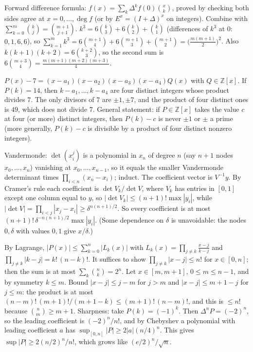 \documentclass[11pt,a4paper]{article}
\begin{document}
 Forward difference formula: $f(x)=\sum_k\Delta^kf(0)\binom xk$, proved by checking both sides agree at $x=0,\dots,\deg f$ (or by $E^x=(I+\Delta)^x$ on integers). Combine with $\sum_{k=0}^{m}\binom kj=\binom{m+1}{j+1}$.
 $k^3=6\binom k3+6\binom k2+\binom k1$ (differences of $k^3$ at $0$: $0,1,6,6$), so $\sum_{k=1}^mk^3=6\binom{m+1}4+6\binom{m+1}3+\binom{m+1}2=\bigl(\frac{m(m+1)}2\bigr)^2$. Also $k(k+1)(k+2)=6\binom{k+2}3$, so the second sum is $6\binom{m+3}4=\frac{m(m+1)(m+2)(m+3)}4$.

 $P(x)-7=(x-a_1)(x-a_2)(x-a_3)(x-a_4)Q(x)$ with $Q\in\mathbb{Z}[x]$.
 If $P(k)=14$, then $k-a_1,\dots,k-a_4$ are four distinct integers whose product divides $7$. The only divisors of $7$ are $\pm1,\pm7$, and the product of four distinct ones is $49$, which does not divide $7$.
 General statement: if $P\in\mathbb{Z}[x]$ takes the value $c$ at four (or more) distinct integers, then $P(k)-c$ is never $\pm1$ or $\pm$ a prime (more generally, $P(k)-c$ is divisible by a product of four distinct nonzero integers).

 Vandermonde: $\det(x_i^{j})$ is a polynomial in $x_n$ of degree $n$ (say $n+1$ nodes $x_0,\dots,x_n$) vanishing at $x_0,\dots,x_{n-1}$, so it equals the smaller Vandermonde determinant times $\prod_{i<n}(x_n-x_i)$; induct.
 The coefficient vector is $V^{-1}y$. By Cramer's rule each coefficient is $\det V_k/\det V$, where $V_k$ has entries in $[0,1]$ except one column equal to $y$, so $|\det V_k|\le(n+1)!\max|y_i|$, while $|\det V|=\prod_{i<j}|x_j-x_i|\ge\delta^{n(n+1)/2}$. So every coefficient is at most $(n+1)!\,\delta^{-n(n+1)/2}\max|y_i|$. (Some dependence on $\delta$ is unavoidable: the nodes $0,\delta$ with values $0,1$ give $x/\delta$.)

 By Lagrange, $|P(x)|\le\sum_{k=0}^n|L_k(x)|$ with $L_k(x)=\prod_{j\ne k}\frac{x-j}{k-j}$ and $\prod_{j\ne k}|k-j|=k!\,(n-k)!$. It suffices to show $\prod_{j\ne k}|x-j|\le n!$ for $x\in[0,n]$; then the sum is at most $\sum_k\binom nk=2^n$.
 Let $x\in[m,m+1]$, $0\le m\le n-1$, and by symmetry $k\le m$. Bound $|x-j|\le j-m$ for $j>m$ and $|x-j|\le m+1-j$ for $j\le m$: the product is at most $(n-m)!\,(m+1)!/(m+1-k)\le(m+1)!\,(n-m)!$, and this is $\le n!$ because $\binom nm\ge m+1$.
 Sharpness: take $P(k)=(-1)^k$. Then $\Delta^nP=(-2)^n$, so the leading coefficient is $(-2)^n/n!$, and by Chebyshev a polynomial with leading coefficient $a$ has $\sup_{[0,n]}|P|\ge2|a|(n/4)^n$. This gives $\sup|P|\ge2(n/2)^n/n!$, which grows like $(e/2)^n/\sqrt n$.
\end{document}
